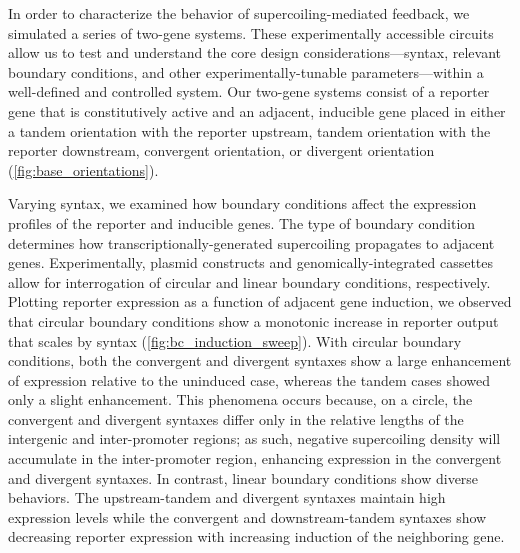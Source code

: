 \documentclass[11pt]{article} %
\begin{document}
In order to characterize the behavior of supercoiling-mediated feedback, we simulated a series of two-gene systems. These experimentally accessible circuits allow us to test and understand the core design considerations---syntax, relevant boundary conditions, and other experimentally-tunable parameters---within a well-defined and controlled system. Our two-gene systems consist of a reporter gene that is constitutively active and an adjacent, inducible gene placed in either a tandem orientation with the reporter upstream, tandem orientation with the reporter downstream, convergent orientation, or divergent orientation (\cref{fig:base_orientations}).

Varying syntax, we examined how boundary conditions affect the expression profiles of the reporter and inducible genes. The type of boundary condition determines how transcriptionally-generated supercoiling propagates to adjacent genes. Experimentally, plasmid constructs and genomically-integrated cassettes allow for interrogation of circular and linear boundary conditions, respectively.  Plotting reporter expression as a function of adjacent gene induction, we observed that circular boundary conditions show a monotonic increase in reporter output that scales by syntax (\cref{fig:bc_induction_sweep}). With circular boundary conditions, both the convergent and divergent syntaxes show a large enhancement of expression relative to the uninduced case, whereas the tandem cases showed only a slight enhancement. This phenomena occurs because, on a circle, the convergent and divergent syntaxes differ only in the relative lengths of the intergenic and inter-promoter regions; as such, negative supercoiling density will accumulate in the inter-promoter region, enhancing expression in the convergent and divergent syntaxes. In contrast, linear boundary conditions show diverse behaviors. The upstream-tandem and divergent syntaxes maintain high expression levels while the convergent and downstream-tandem syntaxes show decreasing reporter expression with increasing induction of the neighboring gene.
\end{document}
